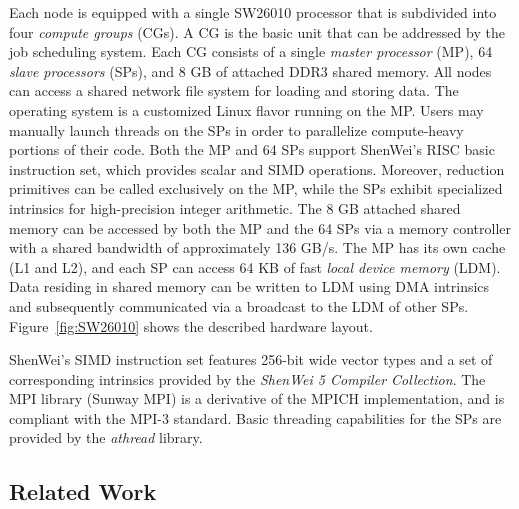 \documentclass[conference]{IEEEtran}
\begin{document}
Each node is equipped with a single SW26010 processor that is
subdivided into four {\em compute groups} (CGs). A CG is the basic
unit that can be addressed by the job scheduling system. Each CG
consists of a single {\em master processor} (MP), 64 {\em slave
  processors} (SPs), and 8 GB of attached DDR3 shared memory. All
nodes can access a shared network file system for loading and storing
data. The operating system is a customized Linux flavor running on the
MP.  Users may manually launch threads on the SPs in order to
parallelize compute-heavy portions of their code. Both the MP and 64
SPs support ShenWei's RISC basic instruction set, which provides
scalar and SIMD operations. Moreover, reduction primitives can be
called exclusively on the MP, while the SPs exhibit specialized
intrinsics for high-precision integer arithmetic. The 8 GB attached
shared memory can be accessed by both the MP and the 64 SPs via a
memory controller with a shared bandwidth of approximately 136
GB/s. The MP has its own cache (L1 and L2), and each SP can access 64
KB of fast {\em local device memory} (LDM). Data residing in shared
memory can be written to LDM using DMA intrinsics and subsequently
communicated via a broadcast to the LDM of other
SPs. Figure~\ref{fig:SW26010} shows the described hardware layout.

ShenWei's SIMD instruction set features 256-bit wide vector types and a set of corresponding intrinsics provided by the \emph{ShenWei 5 Compiler Collection}.  The MPI library (Sunway MPI) is a derivative of the MPICH implementation, and is compliant with the MPI-3 standard.  Basic threading capabilities for the SPs are provided by the \emph{athread} library.

\subsection{Related Work}
\end{document}
